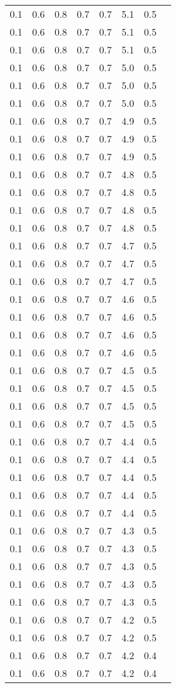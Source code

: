 \begin{tabular}{L{1in}|L{1in}|L{1in}|L{1in}|L{1in}|L{1in}|L{1in}|L{1in}}
0.1&0.6&0.8&0.7&0.7&5.1&0.5\\
0.1&0.6&0.8&0.7&0.7&5.1&0.5\\
0.1&0.6&0.8&0.7&0.7&5.1&0.5\\
0.1&0.6&0.8&0.7&0.7&5.0&0.5\\
0.1&0.6&0.8&0.7&0.7&5.0&0.5\\
0.1&0.6&0.8&0.7&0.7&5.0&0.5\\
0.1&0.6&0.8&0.7&0.7&4.9&0.5\\
0.1&0.6&0.8&0.7&0.7&4.9&0.5\\
0.1&0.6&0.8&0.7&0.7&4.9&0.5\\
0.1&0.6&0.8&0.7&0.7&4.8&0.5\\
0.1&0.6&0.8&0.7&0.7&4.8&0.5\\
0.1&0.6&0.8&0.7&0.7&4.8&0.5\\
0.1&0.6&0.8&0.7&0.7&4.8&0.5\\
0.1&0.6&0.8&0.7&0.7&4.7&0.5\\
0.1&0.6&0.8&0.7&0.7&4.7&0.5\\
0.1&0.6&0.8&0.7&0.7&4.7&0.5\\
0.1&0.6&0.8&0.7&0.7&4.6&0.5\\
0.1&0.6&0.8&0.7&0.7&4.6&0.5\\
0.1&0.6&0.8&0.7&0.7&4.6&0.5\\
0.1&0.6&0.8&0.7&0.7&4.6&0.5\\
0.1&0.6&0.8&0.7&0.7&4.5&0.5\\
0.1&0.6&0.8&0.7&0.7&4.5&0.5\\
0.1&0.6&0.8&0.7&0.7&4.5&0.5\\
0.1&0.6&0.8&0.7&0.7&4.5&0.5\\
0.1&0.6&0.8&0.7&0.7&4.4&0.5\\
0.1&0.6&0.8&0.7&0.7&4.4&0.5\\
0.1&0.6&0.8&0.7&0.7&4.4&0.5\\
0.1&0.6&0.8&0.7&0.7&4.4&0.5\\
0.1&0.6&0.8&0.7&0.7&4.4&0.5\\
0.1&0.6&0.8&0.7&0.7&4.3&0.5\\
0.1&0.6&0.8&0.7&0.7&4.3&0.5\\
0.1&0.6&0.8&0.7&0.7&4.3&0.5\\
0.1&0.6&0.8&0.7&0.7&4.3&0.5\\
0.1&0.6&0.8&0.7&0.7&4.3&0.5\\
0.1&0.6&0.8&0.7&0.7&4.2&0.5\\
0.1&0.6&0.8&0.7&0.7&4.2&0.5\\
0.1&0.6&0.8&0.7&0.7&4.2&0.4\\
0.1&0.6&0.8&0.7&0.7&4.2&0.4\\

\end{tabular}
